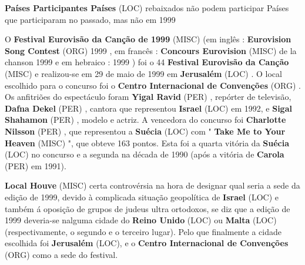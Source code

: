 \documentclass[12pt,a4paper]{article}
\begin{document}
\textbf{Países Participantes Países} (LOC) rebaixados não podem participar Países que participaram no passado, mas não em 1999

O \textbf{Festival Eurovisão da Canção de 1999} (MISC) (em inglês : \textbf{Eurovision Song Contest} (ORG) 1999 , em francês : \textbf{Concours Eurovision} (MISC) de la chanson 1999 e em hebraico :  1999 ) foi o 44 \textbf{Festival Eurovisão da Canção} (MISC) e realizou-se em 29 de maio de 1999 em \textbf{Jerusalém} (LOC) . O local escolhido para o concurso foi o \textbf{Centro Internacional de Convenções} (ORG) . Os anfitriões do espectáculo foram \textbf{Yigal Ravid} (PER) , repórter de televisão, \textbf{Dafna Dekel} (PER) , cantora que representou \textbf{Israel} (LOC) em 1992, e \textbf{Sigal Shahamon} (PER) , modelo e actriz. A vencedora do concurso foi \textbf{Charlotte Nilsson} (PER) , que representou a \textbf{Suécia} (LOC) com " \textbf{Take Me to Your Heaven} (MISC) ", que obteve 163 pontos. Esta foi a quarta vitória da \textbf{Suécia} (LOC) no concurso e a segunda na década de 1990 (após a vitória de \textbf{Carola} (PER) em 1991).



\textbf{Local Houve} (MISC) certa controvérsia na hora de designar qual seria a sede da edição de 1999, devido à complicada situação geopolítica de \textbf{Israel} (LOC) e também á oposição de grupos de judeus ultra ortodoxos, se diz que a edição de 1999 deveria-se nalguma cidade do \textbf{Reino Unido} (LOC) ou \textbf{Malta} (LOC) (respectivamente, o segundo e o terceiro lugar). Pelo que finalmente a cidade escolhida foi \textbf{Jerusalém} (LOC), e o \textbf{Centro Internacional de Convenções} (ORG) como a sede do festival.
\end{document}

